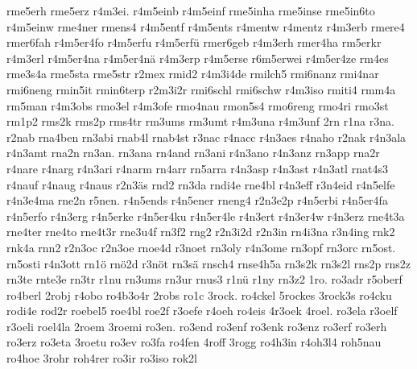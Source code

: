 {    rme5erh
    rme5erz
    r4m3ei.
    r4m5einb
    r4m5einf
    rme5inha
    rme5inse
    rme5in6to
    r4m5einw
    rme4ner
    rmens4
    r4m5entf
    r4m5ents
    r4mentw
    r4mentz
    r4m3erb
    rmere4
    rmer6fah
    r4m5er4fo
    r4m5erfu
    r4m5erfü
    rmer6geb
    r4m3erh
    rmer4ha
    rm5erkr
    r4m3erl
    r4m5er4na
    r4m5er4nä
    r4m3erp
    r4m5erse
    r6m5erwei
    r4m5er4ze
    rm4es
    rme3s4a
    rme5sta
    rme5str
    r2mex
    rmid2
    r4m3i4de
    rmilch5
    rmi6nanz
    rmi4nar
    rmi6neng
    rmin5it
    rmin6terp
    r2m3i2r
    rmi6schl
    rmi6schw
    r4m3iso
    rmiti4
    rmm4a
    rm5man
    r4m3obs
    rmo3el
    r4m3ofe
    rmo4nau
    rmon5s4
    rmo6reng
    rmo4ri
    rmo3st
    rm1p2
    rms2k
    rms2p
    rms4tr
    rm3ums
    rm3umt
    r4m3una
    r4m3unf
    2rn
    r1na
    r3na.
    r2nab
    rna4ben
    rn3abi
    rnab4l
    rnab4st
    r3nac
    r4nacc
    r4n3aes
    r4naho
    r2nak
    r4n3ala
    r4n3amt
    rna2n
    rn3an.
    rn3ana
    rn4and
    rn3ani
    r4n3ano
    r4n3anz
    rn3app
    rna2r
    r4nare
    r4narg
    r4n3ari
    r4narm
    rn4arr
    rn5arra
    r4n3asp
    r4n3ast
    r4n3atl
    rnat4s3
    r4nauf
    r4naug
    r4naus
    r2n3äs
    rnd2
    rn3da
    rndi4e
    rne4bl
    r4n3eff
    r3n4eid
    r4n5elfe
    r4n3e4ma
    rne2n
    r5nen.
    r4n5ends
    r4n5ener
    rneng4
    r2n3e2p
    r4n5erbi
    r4n5er4fa
    r4n5erfo
    r4n3erg
    r4n5erke
    r4n5er4ku
    r4n5er4le
    r4n3ert
    r4n3er4w
    r4n3erz
    rne4t3a
    rne4ter
    rne4to
    rne4t3r
    rne3u4f
    rn3f2
    rng2
    r2n3i2d
    r2n3in
    rn4i3na
    r3n4ing
    rnk2
    rnk4a
    rnn2
    r2n3oc
    r2n3oe
    rnoe4d
    r3noet
    rn3oly
    r4n3ome
    rn3opf
    rn3orc
    rn5ost.
    rn5osti
    r4n3ott
    rn1ö
    rnö2d
    r3nöt
    rn3sä
    rnsch4
    rnse4h5a
    rn3s2k
    rn3s2l
    rns2p
    rns2z
    rn3te
    rnte3e
    rn3tr
    r1nu
    rn3ums
    rn3ur
    rnus3
    r1nü
    r1ny
    rn3z2
    1ro.
    ro3adr
    r5oberf
    ro4berl
    2robj
    r4obo
    ro4b3o4r
    2robs
    ro1c
    3rock.
    ro4ckel
    5rockes
    3rock3s
    ro4cku
    rodi4e
    rod2r
    roebel5
    roe4bl
    roe2f
    r3oefe
    r4oeh
    ro4eis
    4r3oek
    4roel.
    ro3ela
    r3oelf
    r3oeli
    roel4la
    2roem
    3roemi
    ro3en.
    ro3end
    ro3enf
    ro3enk
    ro3enz
    ro3erf
    ro3erh
    ro3erz
    ro3eta
    3roetu
    ro3ev
    ro3fa
    ro4fen
    4roff
    3rogg
    ro4h3in
    r4oh3l4
    roh5nau
    ro4hoe
    3rohr
    roh4rer
    ro3ir
    ro3iso
    rok2l
}
